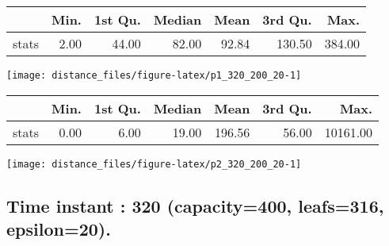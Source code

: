 \documentclass[
  9pt,
  landscape]{article}
\begin{document}
\begin{minipage}{0.5\textwidth} 
\centering 
\begin{tabular}{rrrrrrr}
  \hline
 & Min. & 1st Qu. & Median & Mean & 3rd Qu. & Max. \\ 
  \hline
stats & 2.00 & 44.00 & 82.00 & 92.84 & 130.50 & 384.00 \\ 
   \hline
\end{tabular}
\vspace{0.5cm} 


\texttt{[image: distance\_files/figure-latex/p1\_320\_200\_20-1]} 

\end{minipage} 
\begin{minipage}{0.5\textwidth} 
\centering 
\begin{tabular}{rrrrrrr}
  \hline
 & Min. & 1st Qu. & Median & Mean & 3rd Qu. & Max. \\ 
  \hline
stats & 0.00 & 6.00 & 19.00 & 196.56 & 56.00 & 10161.00 \\ 
   \hline
\end{tabular}
\vspace{0.5cm} 


\texttt{[image: distance\_files/figure-latex/p2\_320\_200\_20-1]} 

\end{minipage}

\pagebreak

\hypertarget{time-instant-320-capacity400-leafs316-epsilon20.}{%
\subsection{Time instant : 320 (capacity=400, leafs=316,
epsilon=20).}\label{time-instant-320-capacity400-leafs316-epsilon20.}}
\end{document}

